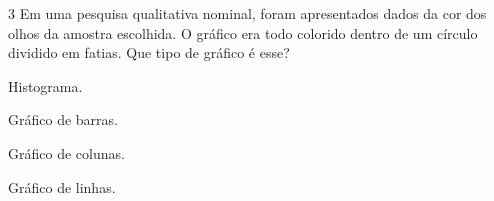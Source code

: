 





\num{3} Em uma pesquisa qualitativa nominal, foram apresentados dados da cor
dos olhos da amostra escolhida. O gráfico era todo colorido dentro de um
círculo dividido em fatias. Que tipo de gráfico é esse?

\begin{escolha}
\item
  Histograma.
\item
  Gráfico de barras.
\item
  Gráfico de colunas.
\item
  Gráfico de linhas.
\end{escolha}






